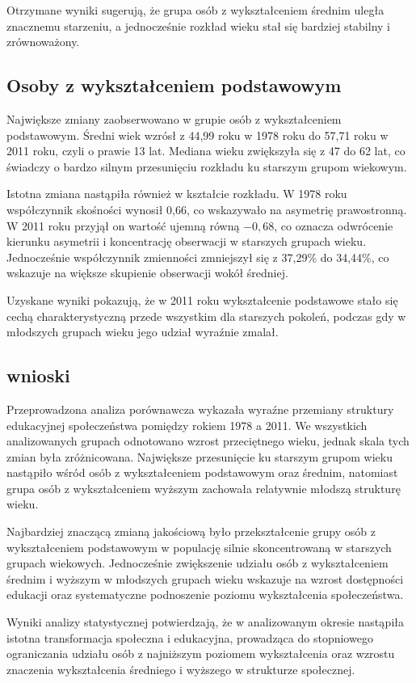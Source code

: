 \documentclass[15pt]{article}
\begin{document}
Otrzymane wyniki sugerują, że grupa osób z wykształceniem średnim uległa znacznemu starzeniu, a jednocześnie rozkład wieku stał się bardziej stabilny i zrównoważony.

\subsection{Osoby z wykształceniem podstawowym}

Największe zmiany zaobserwowano w grupie osób z wykształceniem podstawowym. Średni wiek wzrósł z 44{,}99 roku w 1978 roku do 57{,}71 roku w 2011 roku, czyli o prawie 13 lat. Mediana wieku zwiększyła się z 47 do 62 lat, co świadczy o bardzo silnym przesunięciu rozkładu ku starszym grupom wiekowym.

Istotna zmiana nastąpiła również w kształcie rozkładu. W 1978 roku współczynnik skośności wynosił 0{,}66, co wskazywało na asymetrię prawostronną. W 2011 roku przyjął on wartość ujemną równą $-0{,}68$, co oznacza odwrócenie kierunku asymetrii i koncentrację obserwacji w starszych grupach wieku. Jednocześnie współczynnik zmienności zmniejszył się z 37{,}29\% do 34{,}44\%, co wskazuje na większe skupienie obserwacji wokół średniej.

Uzyskane wyniki pokazują, że w 2011 roku wykształcenie podstawowe stało się cechą charakterystyczną przede wszystkim dla starszych pokoleń, podczas gdy w młodszych grupach wieku jego udział wyraźnie zmalał.

\subsection{wnioski}

Przeprowadzona analiza porównawcza wykazała wyraźne przemiany struktury edukacyjnej społeczeństwa pomiędzy rokiem 1978 a 2011. We wszystkich analizowanych grupach odnotowano wzrost przeciętnego wieku, jednak skala tych zmian była zróżnicowana. Największe przesunięcie ku starszym grupom wieku nastąpiło wśród osób z wykształceniem podstawowym oraz średnim, natomiast grupa osób z wykształceniem wyższym zachowała relatywnie młodszą strukturę wieku.

Najbardziej znaczącą zmianą jakościową było przekształcenie grupy osób z wykształceniem podstawowym w populację silnie skoncentrowaną w starszych grupach wiekowych. Jednocześnie zwiększenie udziału osób z wykształceniem średnim i wyższym w młodszych grupach wieku wskazuje na wzrost dostępności edukacji oraz systematyczne podnoszenie poziomu wykształcenia społeczeństwa.

Wyniki analizy statystycznej potwierdzają, że w analizowanym okresie nastąpiła istotna transformacja społeczna i edukacyjna, prowadząca do stopniowego ograniczania udziału osób z najniższym poziomem wykształcenia oraz wzrostu znaczenia wykształcenia średniego i wyższego w strukturze społecznej.
\end{document}
